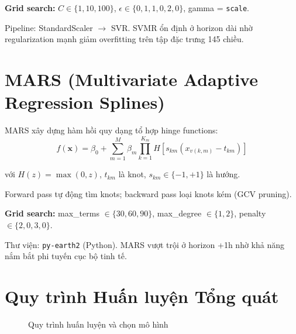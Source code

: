 \documentclass[12pt,a4paper]{report}
\begin{document}
\textbf{Grid search:} $C \in \{1, 10, 100\}$, $\epsilon \in \{0{,}1, 1{,}0, 2{,}0\}$, gamma = \texttt{scale}.

Pipeline: StandardScaler $\to$ SVR. SVMR ổn định ở horizon dài nhờ regularization mạnh giảm overfitting trên tập đặc trưng 145 chiều.

\section{MARS (Multivariate Adaptive Regression Splines)}

MARS xây dựng hàm hồi quy dạng tổ hợp hinge functions:
\begin{equation}
  f(\mathbf{x}) = \beta_0 + \sum_{m=1}^{M} \beta_m \prod_{k=1}^{K_m} H\!\left[s_{km}(x_{v(k,m)} - t_{km})\right]
\end{equation}

với $H(z) = \max(0, z)$, $t_{km}$ là knot, $s_{km} \in \{-1, +1\}$ là hướng.

Forward pass tự động tìm knots; backward pass loại knots kém (GCV pruning).

\textbf{Grid search:} max\_terms $\in \{30, 60, 90\}$, max\_degree $\in \{1, 2\}$, penalty $\in \{2{,}0, 3{,}0\}$.

Thư viện: \texttt{py-earth2} (Python). MARS vượt trội ở horizon +1h nhờ khả năng nắm bắt phi tuyến cục bộ tinh tế.

\section{Quy trình Huấn luyện Tổng quát}

\begin{figure}[H]
\centering
{}
\caption{Quy trình huấn luyện và chọn mô hình}
\label{fig:train_pipeline}
\end{figure}
\end{document}
